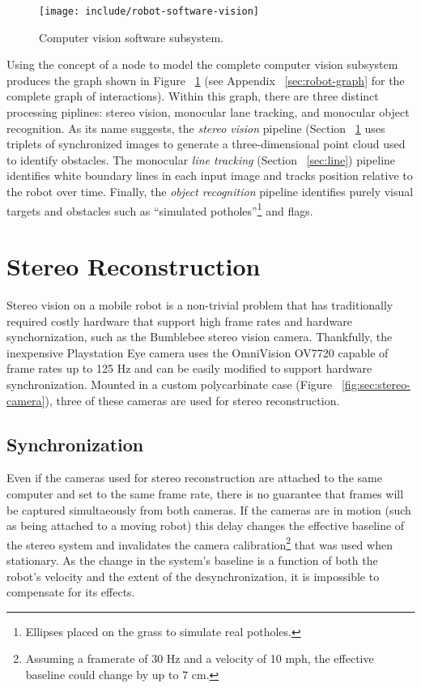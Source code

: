 \documentclass[11pt,twocolumn]{article}
\begin{document}
\begin{figure}
	\centering
	\texttt{[image: include/robot-software-vision]}
	\caption{Computer vision software subsystem.}
	\label{fig:robot-vision}
\end{figure}

Using the concept of a node to model the complete computer vision subsystem
produces the graph shown in Figure ~\ref{fig:robot-vision} (see Appendix
~\ref{sec:robot-graph} for the complete graph of interactions). Within this
graph, there are three distinct processing piplines: stereo vision, monocular
lane tracking, and monocular object recognition. As its name suggests, the
\textit{stereo vision} pipeline (Section ~\ref{sec:stereo} uses triplets of
synchronized images to generate a three-dimensional point cloud used to
identify obstacles. The monocular \textit{line tracking} (Section
~\ref{sec:line}) pipeline identifies white boundary lines in each input image
and tracks position relative to the robot over time. Finally, the
\textit{object recognition} pipeline identifies purely visual targets and
obstacles such as ``simulated potholes''\footnote{Ellipses placed on the grass
to simulate real potholes.} and flags.


\section{Stereo Reconstruction}
\label{sec:stereo}
Stereo vision on a mobile robot is a non-trivial problem that has traditionally
required costly hardware that support high frame rates and hardware
synchornization, such as the Bumblebee stereo vision camera. Thankfully, the
inexpensive Playstation Eye camera uses the OmniVision OV7720 capable of frame
rates up to 125 Hz and can be easily modified to support hardware
synchronization. Mounted in a custom polycarbinate case (Figure
~\ref{fig:sec:stereo-camera}), three of these cameras are used for stereo
reconstruction.

\subsection{Synchronization}
\label{sec:stereo-sync}
Even if the cameras used for stereo reconstruction are attached to the same
computer and set to the same frame rate, there is no guarantee that frames will
be captured simultaeously from both cameras. If the cameras are in motion (such
as being attached to a moving robot) this delay changes the effective baseline
of the stereo system and invalidates the camera calibration\footnote{Assuming a
framerate of 30 Hz and a velocity of 10 mph, the effective baseline could change
by up to 7 cm.} that was used when stationary. As the change in the system's
baseline is a function of both the robot's velocity and the extent of the
desynchronization, it is impossible to compensate for its effects.
\end{document}
